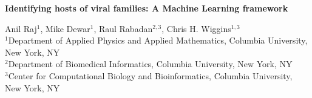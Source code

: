 \documentclass[11pt,amsmath,amssymb,amstex]{article}
\begin{document}
\begin{center}
\pagestyle{empty}
\textbf{Identifying hosts of viral families: A Machine Learning framework}

\small{
Anil Raj$^{1}$, Mike Dewar$^{1}$, Raul Rabadan$^{2,3}$, Chris H. Wiggins$^{1,3}$\\
$^{1}$Department of Applied Physics and Applied Mathematics, Columbia University, New York, NY\\
$^{2}$Department of Biomedical Informatics, Columbia University, New York, NY\\
$^{3}$Center for Computational Biology and Bioinformatics, Columbia University, New York, NY\\
}
\end{center}



%
%
\end{document}
